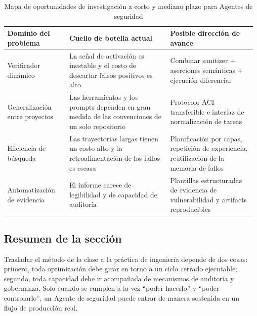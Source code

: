\begin{table}[H]
\centering
\begin{tabular}{p{3.0cm}p{4.4cm}p{4.8cm}}
\toprule
\textbf{Dominio del problema} & \textbf{Cuello de botella actual} & \textbf{Posible dirección de avance} \\
\midrule
Verificador dinámico & La señal de activación es inestable y el costo de descartar falsos positivos es alto & Combinar sanitizer + aserciones semánticas + ejecución diferencial \\
Generalización entre proyectos & Las herramientas y los prompts dependen en gran medida de las convenciones de un solo repositorio & Protocolo ACI transferible e interfaz de normalización de tareas \\
Eficiencia de búsqueda & Las trayectorias largas tienen un costo alto y la retroalimentación de los fallos es escasa & Planificación por capas, repetición de experiencia, reutilización de la memoria de fallos \\
Automatización de evidencia & El informe carece de legibilidad y de capacidad de auditoría & Plantillas estructuradas de evidencia de vulnerabilidad y artifacts reproducibles \\
\bottomrule
\end{tabular}
\caption{Mapa de oportunidades de investigación a corto y mediano plazo para Agentes de seguridad}
\end{table}

\subsection{Resumen de la sección}
Trasladar el método de la clase a la práctica de ingeniería depende de dos cosas: primero, toda optimización debe girar en torno a un ciclo cerrado ejecutable; segundo, toda capacidad debe ir acompañada de mecanismos de auditoría y gobernanza. Solo cuando se cumplen a la vez ``poder hacerlo'' y ``poder controlarlo'', un Agente de seguridad puede entrar de manera sostenida en un flujo de producción real.

